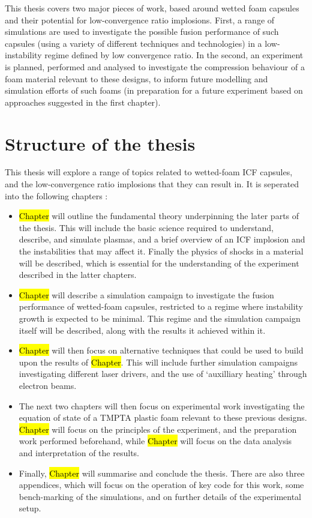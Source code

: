This thesis covers two major pieces of work, based around wetted foam capsules and their potential for low-convergence ratio implosions. First, a range of simulations are used to investigate the possible fusion performance of such capsules (using a variety of different techniques and technologies) in a low-instability regime defined by low convergence ratio. In the second, an experiment is planned, performed and analysed to investigate the compression behaviour of a foam material relevant to these designs, to inform future modelling and simulation efforts of such foams (in preparation for a future experiment based on approaches suggested in the first chapter).

\section{Structure of the thesis}

This thesis will explore a range of topics related to wetted-foam ICF capsules, and the low-convergence ratio implosions that they can result in. It is seperated into the following chapters :
\begin{itemize}
	\item \hl{Chapter} will outline the fundamental theory underpinning the later parts of the thesis. This will include the basic science required to understand, describe, and simulate plasmas, and a brief overview of an ICF implosion and the instabilities that may affect it. Finally the physics of shocks in a material will be described, which is essential for the understanding of the experiment described in the latter chapters.
	\item \hl{Chapter} will describe a simulation campaign to investigate the fusion performance of wetted-foam capsules, restricted to a regime where instability growth is expected to be minimal. This regime and the simulation campaign itself will be described, along with the results it achieved within it.
	\item \hl{Chapter} will then focus on alternative techniques that could be used to build upon the results of \hl{Chapter}. This will include further simulation campaigns investigating different laser drivers, and the use of `auxilliary heating' through electron beams.
	\item The next two chapters will then focus on experimental work investigating the equation of state of a TMPTA plastic foam relevant to these previous designs. \hl{Chapter} will focus on the principles of the experiment, and the preparation work performed beforehand, while \hl{Chapter} will focus on the data analysis and interpretation of the results.
	\item Finally, \hl{Chapter} will summarise and conclude the thesis. There are also three appendices, which will focus on the operation of key code for this work, some bench-marking of the simulations, and on further details of the experimental setup.
\end{itemize}

